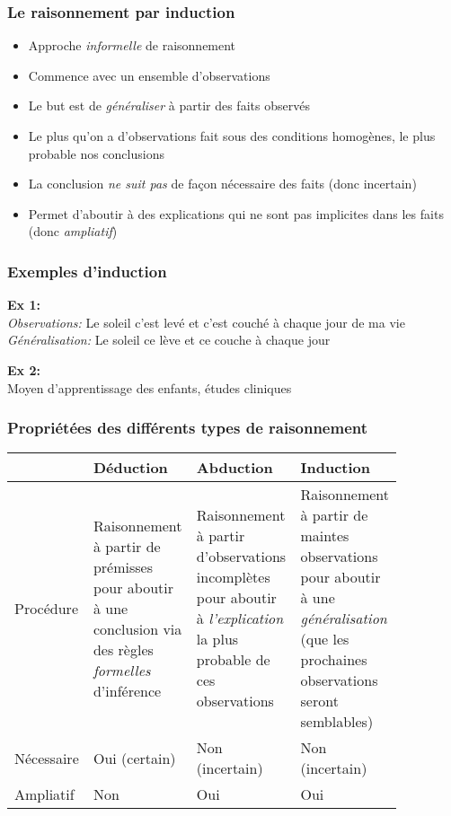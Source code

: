 \documentclass{beamer}
\begin{document}
\begin{frame}
    \frametitle{Le raisonnement par induction}
    \begin{itemize}
      \item Approche \emph{informelle} de raisonnement \pause
      \item Commence avec un ensemble d’observations \pause
      \item Le but est de \emph{généraliser} à partir des faits observés \pause
      \item Le plus qu’on a d’observations fait sous des conditions homogènes,
            le plus probable nos conclusions \pause
      \item La conclusion \emph{ne suit pas} de façon nécessaire des faits (donc incertain) \pause
      \item Permet d’aboutir à des explications qui ne sont pas
            implicites dans les faits (donc \emph{ampliatif})
    \end{itemize}
\end{frame}


\begin{frame}
    \frametitle{Exemples d'induction}
    \textbf{Ex 1:}\\ \pause
    \emph{Observations:} Le soleil c’est levé et c’est couché à chaque jour de ma vie \pause
    \emph{Généralisation:} Le soleil ce lève et ce couche à chaque jour\

    \bigskip \pause

    \textbf{Ex 2:}\\
    Moyen d’apprentissage des enfants, études cliniques
\end{frame}


\begin{frame}
    \frametitle{Propriétées des différents types de raisonnement}
    \begin{center}
      \begin{tabular}{ | p{0.14\linewidth} | p{0.24\linewidth} | p{0.24\linewidth} | p{0.24\linewidth} | }
        \hline \hline
         & Déduction & Abduction & Induction \\
        \hline \hline
        Procédure & Raisonnement à partir de prémisses pour aboutir à une conclusion via des règles \emph{formelles} d'inférence
                  & Raisonnement à partir d'observations incomplètes pour aboutir à \emph{l'explication}
                    la plus probable de ces observations
                  & Raisonnement à partir de maintes observations pour aboutir à une \emph{généralisation}
                    (que les prochaines observations seront semblables)
                  \\
        \hline
        Nécessaire & Oui (certain) & Non (incertain) & Non (incertain) \\
        \hline
        Ampliatif & Non & Oui & Oui \\
        \hline \hline
      \end{tabular}
    \end{center}
\end{frame}


\end{document}
